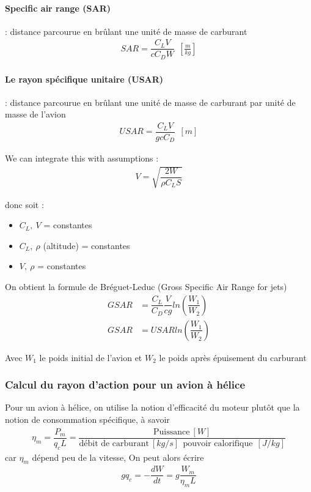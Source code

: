 \documentclass{report}
\begin{document}
\paragraph{Specific air range (SAR)}: distance parcourue en brûlant une unité de masse de carburant 
\begin{eqnarray}
SAR = \dfrac{C_L V}{cC_DW}~~[\frac{m}{kg}]
\end{eqnarray}

\paragraph{Le rayon spécifique unitaire (USAR)}: distance parcourue en brûlant une unité de masse de carburant par unité de masse de l’avion
\begin{eqnarray}
USAR = \dfrac{C_L V}{gcC_D}~~[m]
\end{eqnarray}

We can integrate this with assumptions :
\begin{eqnarray}
V=\sqrt{\dfrac{2W}{\rho C_L S}} 
\end{eqnarray}

donc soit :
\begin{itemize}
    \item $C_L,~V$ = constantes
    \item $C_L,~\rho$ (altitude) = constantes
    \item $V,~\rho$ = constantes
\end{itemize}


On obtient la formule de Bréguet-Leduc (Gross Specific Air Range for jets)
\begin{eqnarray}
GSAR &= \dfrac{C_L}{C_D}\dfrac{V}{c g} ln(\dfrac{W_1}{W_2})\\
GSAR &= USAR ln(\dfrac{W_1}{W_2})
\end{eqnarray}

Avec $W_1$ le poids initial de l'avion et $W_2$ le poids après épuisement du carburant

\subsubsection{Calcul du rayon d'action pour un avion à hélice}

Pour un avion à hélice, on utilise la notion d’efficacité du moteur plutôt que la notion de consommation spécifique, à savoir
\begin{eqnarray}
\eta_m = \dfrac{P_m}{q_c L}=\dfrac{\text{Puissance}~[W]}{\text{débit de carburant}~[kg/s]~~\text{pouvoir calorifique}~~[J/kg]}
\end{eqnarray}
car $\eta_m$ dépend peu de la vitesse, On peut alors écrire
\begin{eqnarray}
g q_c = -\dfrac{dW}{dt}=g\dfrac{W_m}{\eta_m L}
\end{eqnarray}
\end{document}
